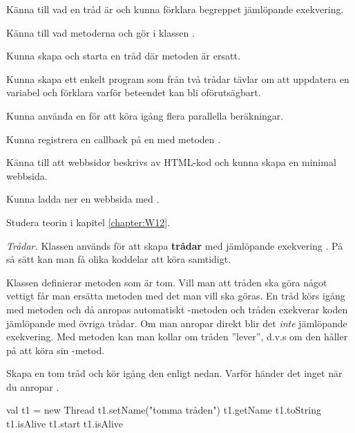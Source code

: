 

\Exercise{\ExeWeekTWELVE}

\begin{Goals}
\item Känna till vad en tråd är och kunna förklara begreppet jämlöpande exekvering.
\item Känna till vad metoderna  och  gör i klassen .
\item Kunna skapa och starta en tråd där metoden  är ersatt.
\item Kunna skapa ett enkelt program som från två trådar tävlar om att uppdatera en variabel och förklara varför beteendet kan bli oförutsägbart.
\item Kunna använda en  för att köra igång flera parallella beräkningar.
\item Kunna registrera en callback på en  med metoden .
\item Känna till att webbsidor beskrivs av HTML-kod och kunna skapa en minimal webbsida.
\item Kunna ladda ner en webbsida med .
\end{Goals}

\begin{Preparations}
\item Studera teorin i kapitel \ref{chapter:W12}.
\end{Preparations}

\BasicTasks %

\Task \emph{Trådar.}  Klassen  används för att skapa  \textbf{trådar} med jämlöpande exekvering . På så sätt kan man få olika koddelar att köra samtidigt. 

Klassen  definierar metoden  som är tom. Vill man att tråden ska göra något vettigt får man ersätta metoden med det man vill ska göras. En tråd körs igång med metoden  och då anropas automatiskt -metoden och tråden exekverar koden jämlöpande med övriga trådar. Om man anropar  direkt blir det \emph{inte} jämlöpande exekvering. Med metoden  kan man kollar om tråden ''lever'', d.v.s om den håller på att köra sin -metod.

\Subtask Skapa en tom tråd och kör igång den enligt nedan. Varför händer det inget när du anropar .
\begin{REPL}
val t1 = new Thread
t1.setName("tomma tråden")
t1.getName
t1.toString
t1.isAlive
t1.start
t1.isAlive
\end{REPL}

